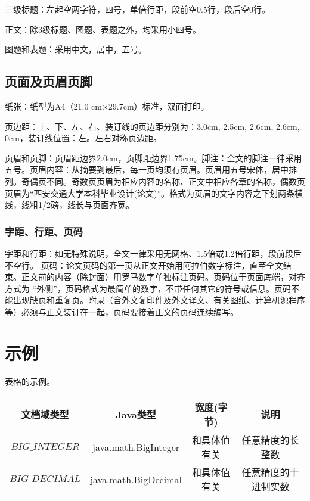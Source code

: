 三级标题：左起空两字符，四号，单倍行距，段前空0.5行，段后空0行。

正文：除3级标题、图题、表题之外，均采用小四号。

图题和表题：采用中文，居中，五号。
\subsection{页面及页眉页脚}
纸张：纸型为A4（21.0 cm×29.7cm）标准，双面打印。

页边距：上、下、左、右、装订线的页边距分别为：3.0cm, 2.5cm, 2.6cm, 2.6cm, 0cm，装订线位置：左。左右对称页边距。

页眉和页脚：页眉距边界2.0cm，页脚距边界1.75cm。脚注：全文的脚注一律采用五号。页眉内容：从摘要到最后，每一页均须有页眉。页眉用五号宋体，居中排列。奇偶页不同。奇数页页眉为相应内容的名称、正文中相应各章的名称，偶数页页眉为“西安交通大学本科毕业设计(论文)”。格式为页眉的文字内容之下划两条横线，线粗1/2磅，线长与页面齐宽。
\subsubsection{字距、行距、页码}
字距和行距：如无特殊说明，全文一律采用无网格、1.5倍或1.2倍行距，段前段后不空行。
页码：论文页码的第一页从正文开始用阿拉伯数字标注，直至全文结束。正文前的内容（除封面）用罗马数字单独标注页码。页码位于页面底端，对齐方式为 “外侧”，页码格式为最简单的数字，不带任何其它的符号或信息。页码不能出现缺页和重复页。附录（含外文复印件及外文译文、有关图纸、计算机源程序等）必须与正文装订在一起，页码要接着正文的页码连续编写。


\section{示例}
表格的示例。

\begin{table}[htbp]\small
  \centering
  \begin{tabular}{cccc}
    \toprule[1.5pt]
    \textbf{文档域类型} & \textbf{Java类型} & \textbf{宽度(字节)} & \textbf{说明} \\
    \midrule[1pt]
    $BIG\_INTEGER$& java.math.BigInteger & 和具体值有关 & 任意精度的长整数 \\
    $BIG\_DECIMAL$ & java.math.BigDecimal & 和具体值有关 & 任意精度的十进制实数 \\
    \bottomrule[1.5pt]
  \end{tabular}
  
\end{table}

